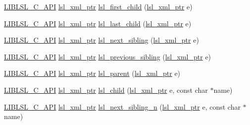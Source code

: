 \begin{DoxyCompactItemize}
\item 
\hyperlink{lsl__cpp_8h_aafd0ef1813e8be84a1420c4f1df64615}{L\+I\+B\+L\+S\+L\+\_\+\+C\+\_\+\+A\+PI} \hyperlink{namespacelsl_a5edc7a49a1a1be1634fe6dce3d59c59b}{lsl\+\_\+xml\+\_\+ptr} \hyperlink{namespacelsl_a00b272ef8da2c1f1a6ea440219728c32}{lsl\+\_\+first\+\_\+child} (\hyperlink{namespacelsl_a5edc7a49a1a1be1634fe6dce3d59c59b}{lsl\+\_\+xml\+\_\+ptr} e)
\item 
\hyperlink{lsl__cpp_8h_aafd0ef1813e8be84a1420c4f1df64615}{L\+I\+B\+L\+S\+L\+\_\+\+C\+\_\+\+A\+PI} \hyperlink{namespacelsl_a5edc7a49a1a1be1634fe6dce3d59c59b}{lsl\+\_\+xml\+\_\+ptr} \hyperlink{namespacelsl_aeb717da468fa8bfc541af78b59052e6d}{lsl\+\_\+last\+\_\+child} (\hyperlink{namespacelsl_a5edc7a49a1a1be1634fe6dce3d59c59b}{lsl\+\_\+xml\+\_\+ptr} e)
\item 
\hyperlink{lsl__cpp_8h_aafd0ef1813e8be84a1420c4f1df64615}{L\+I\+B\+L\+S\+L\+\_\+\+C\+\_\+\+A\+PI} \hyperlink{namespacelsl_a5edc7a49a1a1be1634fe6dce3d59c59b}{lsl\+\_\+xml\+\_\+ptr} \hyperlink{namespacelsl_ad719cddda958c613ff328245dc5b4277}{lsl\+\_\+next\+\_\+sibling} (\hyperlink{namespacelsl_a5edc7a49a1a1be1634fe6dce3d59c59b}{lsl\+\_\+xml\+\_\+ptr} e)
\item 
\hyperlink{lsl__cpp_8h_aafd0ef1813e8be84a1420c4f1df64615}{L\+I\+B\+L\+S\+L\+\_\+\+C\+\_\+\+A\+PI} \hyperlink{namespacelsl_a5edc7a49a1a1be1634fe6dce3d59c59b}{lsl\+\_\+xml\+\_\+ptr} \hyperlink{namespacelsl_a61acf3af105e47f718bbc312766caf44}{lsl\+\_\+previous\+\_\+sibling} (\hyperlink{namespacelsl_a5edc7a49a1a1be1634fe6dce3d59c59b}{lsl\+\_\+xml\+\_\+ptr} e)
\item 
\hyperlink{lsl__cpp_8h_aafd0ef1813e8be84a1420c4f1df64615}{L\+I\+B\+L\+S\+L\+\_\+\+C\+\_\+\+A\+PI} \hyperlink{namespacelsl_a5edc7a49a1a1be1634fe6dce3d59c59b}{lsl\+\_\+xml\+\_\+ptr} \hyperlink{namespacelsl_aa8decbe6cf9d9f1c6358af2d6a475bd5}{lsl\+\_\+parent} (\hyperlink{namespacelsl_a5edc7a49a1a1be1634fe6dce3d59c59b}{lsl\+\_\+xml\+\_\+ptr} e)
\item 
\hyperlink{lsl__cpp_8h_aafd0ef1813e8be84a1420c4f1df64615}{L\+I\+B\+L\+S\+L\+\_\+\+C\+\_\+\+A\+PI} \hyperlink{namespacelsl_a5edc7a49a1a1be1634fe6dce3d59c59b}{lsl\+\_\+xml\+\_\+ptr} \hyperlink{namespacelsl_a023258f274202055146894d26e3cf2ad}{lsl\+\_\+child} (\hyperlink{namespacelsl_a5edc7a49a1a1be1634fe6dce3d59c59b}{lsl\+\_\+xml\+\_\+ptr} e, const char $\ast$name)
\item 
\hyperlink{lsl__cpp_8h_aafd0ef1813e8be84a1420c4f1df64615}{L\+I\+B\+L\+S\+L\+\_\+\+C\+\_\+\+A\+PI} \hyperlink{namespacelsl_a5edc7a49a1a1be1634fe6dce3d59c59b}{lsl\+\_\+xml\+\_\+ptr} \hyperlink{namespacelsl_ac898e643d9e43785030c3e1a7524ea70}{lsl\+\_\+next\+\_\+sibling\+\_\+n} (\hyperlink{namespacelsl_a5edc7a49a1a1be1634fe6dce3d59c59b}{lsl\+\_\+xml\+\_\+ptr} e, const char $\ast$name)

\end{DoxyCompactItemize}
